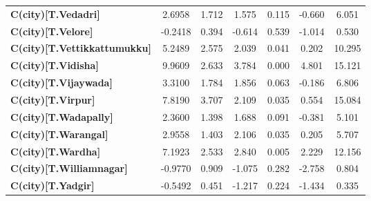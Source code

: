 \begin{center}
\begin{tabular}{lcccccc}
\textbf{C(city)[T.Vedadri]}                                                                         &       2.6958  &        1.712     &     1.575  &         0.115        &       -0.660    &        6.051     \\
\textbf{C(city)[T.Velore]}                                                                          &      -0.2418  &        0.394     &    -0.614  &         0.539        &       -1.014    &        0.530     \\
\textbf{C(city)[T.Vettikkattumukku]}                                                                &       5.2489  &        2.575     &     2.039  &         0.041        &        0.202    &       10.295     \\
\textbf{C(city)[T.Vidisha]}                                                                         &       9.9609  &        2.633     &     3.784  &         0.000        &        4.801    &       15.121     \\
\textbf{C(city)[T.Vijaywada]}                                                                       &       3.3100  &        1.784     &     1.856  &         0.063        &       -0.186    &        6.806     \\
\textbf{C(city)[T.Virpur]}                                                                          &       7.8190  &        3.707     &     2.109  &         0.035        &        0.554    &       15.084     \\
\textbf{C(city)[T.Wadapally]}                                                                       &       2.3600  &        1.398     &     1.688  &         0.091        &       -0.381    &        5.101     \\
\textbf{C(city)[T.Warangal]}                                                                        &       2.9558  &        1.403     &     2.106  &         0.035        &        0.205    &        5.707     \\
\textbf{C(city)[T.Wardha]}                                                                          &       7.1923  &        2.533     &     2.840  &         0.005        &        2.229    &       12.156     \\
\textbf{C(city)[T.Williamnagar]}                                                                    &      -0.9770  &        0.909     &    -1.075  &         0.282        &       -2.758    &        0.804     \\
\textbf{C(city)[T.Yadgir]}                                                                          &      -0.5492  &        0.451     &    -1.217  &         0.224        &       -1.434    &        0.335     \\

\end{tabular}
\end{center}
